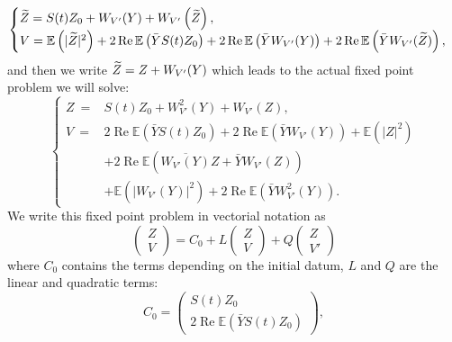 \documentclass[10pt]{amsart}
\theoremstyle{definition}\newtheorem{defi}[theo]{Definition}\newtheorem{rema}[theo]{Remark}\newtheorem{exam}[theo]{Example}\newtheorem{exem}[theo]{Example}\newtheorem{nota}[theo]{Notation}
\newcommand{\E}{\mathbb{E}}
\DeclareMathOperator{\Rel}{Re}
\let\oldtilde\tilde
\renewcommand*{\tilde}[1]{\mathchoice{\widetilde{#1}}{\widetilde{#1}}{\oldtilde{#1}}{\oldtilde{#1}}}
\begin{document}
\[
\begin{cases}
\tilde Z = S(t) Z_0 + W_{V'}(Y) + W_{V'}\left(\tilde Z\right), \\
V = \E \left(|\tilde Z|^2\right) + 2 \Rel \E\left(\bar Y S(t) Z_0\right) + 2 \Rel \E\left(\bar Y W_{V'} (Y)\right) + 2 \Rel \E\left(\bar Y W_{V'}(\tilde Z)\right),
\end{cases}
\]
and then we write $\tilde Z = Z + W_{V'}(Y)$ which leads to the actual fixed point problem we will solve:
\begin{equation}\label{fixedpoint}
\begin{cases}
Z~=& S(t) Z_0 + W_{V'}^2(Y) + W_{V'}(Z), \\
V~=& 2 \Rel \E\left(\bar Y S(t) Z_0\right) + 2 \Rel \E\left(\bar Y W_{V'}(Y)\right)+ \E\left(|Z|^2\right)\\
& + 2 \Rel \E\left(\overline{W_{V'}(Y)} Z 
 + \bar Y W_{V'}(Z)\right)\\
 & + \E \left(\left|W_{V'}(Y)\right|^2\right) +2 \Rel \E\left(\bar Y W_{V'}^2 (Y)\right).
\end{cases}
\end{equation}
We write this fixed point problem in vectorial notation as
\begin{equation} \label{fixedpoint2}
\begin{pmatrix} Z \\ V
\end{pmatrix} = C_0 + L
\begin{pmatrix} Z \\ V
\end{pmatrix} + Q
\begin{pmatrix} Z \\ V'
\end{pmatrix}
\end{equation}
where $C_0$ contains the terms depending on the initial datum, $L$ and $Q$ are the linear and quadratic terms:
\[
C_0 =
\begin{pmatrix}
S(t) Z_0 \\ 2\Rel\E\left(\bar Y S(t) Z_0\right)
\end{pmatrix},
\]
\end{document}
